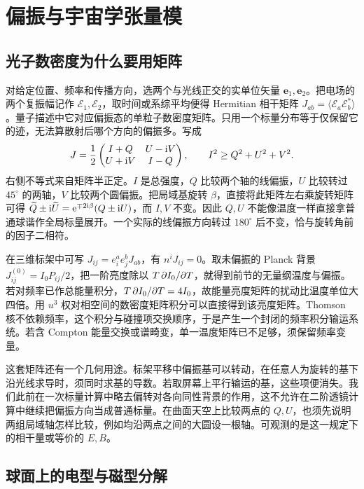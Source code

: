\section{偏振与宇宙学张量模}\label{sec:cosmo-polarization}

\subsection{光子数密度为什么要用矩阵}

对给定位置、频率和传播方向，选两个与光线正交的实单位矢量 $\bm e_1,\bm e_2$。把电场的两个复振幅记作 $\mathcal E_1,\mathcal E_2$，取时间或系综平均便得 Hermitian 相干矩阵 $J_{ab}=\langle\mathcal E_a\mathcal E_b^*\rangle$。量子描述中它对应偏振态的单粒子数密度矩阵。只用一个标量分布等于仅保留它的迹，无法算散射后哪个方向的偏振多。写成
\[
 J=\frac12
 \begin{pmatrix}I+Q&U-\mathrm{i} V\\ U+\mathrm{i} V&I-Q\end{pmatrix},
 \qquad I^2\ge Q^2+U^2+V^2 .
\]
右侧不等式来自矩阵半正定。$I$ 是总强度，$Q$ 比较两个轴的线偏振，$U$ 比较转过 $45^\circ$ 的两轴，$V$ 比较两个圆偏振。把局域基旋转 $\beta$，直接将此矩阵左右乘旋转矩阵可得 $\widetilde Q\pm\mathrm{i}\widetilde U=\mathrm{e}^{\mp2\mathrm{i}\beta}(Q\pm\mathrm{i} U)$，而 $I,V$ 不变。因此 $Q,U$ 不能像温度一样直接拿普通球谐作全局标量展开。一个实际的线偏振方向转过 $180^\circ$ 后不变，恰与旋转角前的因子二相符。

在三维标架中可写 $J_{ij}=e_i^a e_j^b J_{ab}$，有 $n^iJ_{ij}=0$。取未偏振的 Planck 背景 $J_{ij}^{(0)}=I_0P_{ij}/2$，把一阶亮度除以 $T\,\partial I_0/\partial T$，就得到前节的无量纲温度与偏振。若对频率已作总能量积分，$T\,\partial I_0/\partial T=4I_0$，故能量亮度矩阵的扰动比温度单位大四倍。用 $u^3$ 权对相空间的数密度矩阵积分可以直接得到该亮度矩阵。Thomson 核不依赖频率，这个积分与碰撞项交换顺序，于是产生一个封闭的频率积分输运系统。若含 Compton 能量交换或谱畸变，单一温度矩阵已不足够，须保留频率变量。

这套矩阵还有一个几何用途。标架平移中偏振基可以转动，在任意人为旋转的基下沿光线求导时，须同时求基的导数。若取屏幕上平行输运的基，这些项便消失。我们此前在一次标量计算中略去偏转对各向同性背景的作用，这不允许在二阶透镜计算中继续把偏振方向当成普通标量。在曲面天空上比较两点的 $Q,U$，也须先说明两组局域轴怎样比较，例如均沿两点之间的大圆设一根轴。可观测的是这一规定下的相干量或等价的 $E,B$。

\subsection{球面上的电型与磁型分解}

